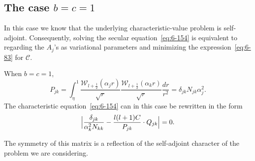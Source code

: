 \subsection{The case $b = c = 1$}\label{sec:60a}
In this case we know that the underlying characteristic-value problem
is self-adjoint. Consequently, solving the secular equation~\eqref{eq:6-154} is
equivalent to regarding the $A_j$'s as variational parameters and mini\-mizing the expression~\eqref{eq:6-83} for $\mathcal{C}$.


When $b = c = 1$,
\begin{equation}\label{eq:6-184}
P_{jk} = \int_\eta^1 \frac{\mathscr{W}_{l+\frac{1}{2}}(\alpha_j r)}{\sqrt{r}}\frac{\mathscr{W}_{l+\frac{1}{2}}(\alpha_k r)}{\sqrt{r}}\frac{dr}{r^2} = \delta_{jk} N_{jk}\alpha_j^2.
\end{equation}
The characteristic equation~\eqref{eq:6-154} can in this case be rewritten in the form
\begin{equation}\label{eq:6-185}
\Bigl|\frac{\delta_{jk}}{\alpha_k^2 N_{kk}} - \frac{l(l+1)\mathcal{C}}{P_{jk}}\cdot Q_{jk}\Bigr| = 0.
\end{equation}

The symmetry of this matrix is a reflection of the self-adjoint character
of the problem we are considering.

